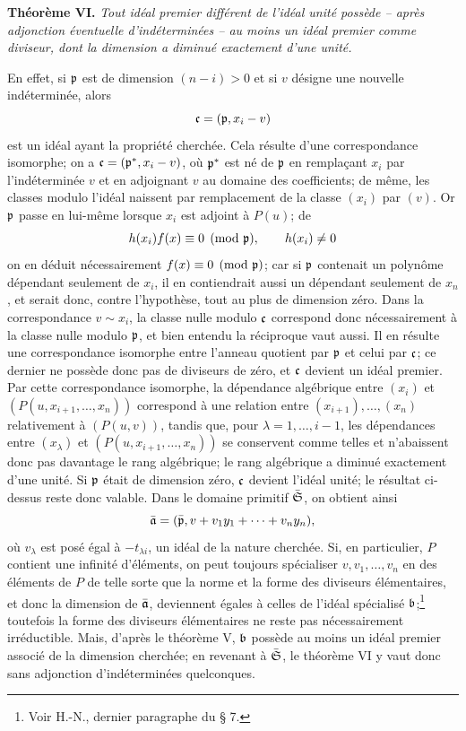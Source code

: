\textbf{Théorème VI.} \emph{Tout idéal premier différent de l'idéal unité possède -- après adjonction éventuelle d'indéterminées -- au moins un idéal premier comme diviseur, dont la dimension a diminué exactement d'une unité.}

En effet, si $\mathfrak p$ est de dimension $(n-i)>0$ et si $v$ désigne une nouvelle indéterminée, alors
\[
 \mathfrak c=(\mathfrak p,x_i-v)
\]
est un idéal ayant la propriété cherchée. Cela résulte d'une correspondance isomorphe; on a $\mathfrak c=(\mathfrak p^*,x_i-v)$, où $\mathfrak p^*$ est né de $\mathfrak p$ en remplaçant $x_i$ par l'indéterminée $v$ et en adjoignant $v$ au domaine des coefficients; de même, les classes modulo l'idéal naissent par remplacement de la classe $(x_i)$ par $(v)$. Or $\mathfrak p$ passe en lui-même lorsque $x_i$ est adjoint à $P(u)$; de
\[
 h(x_i)f(x)\equiv0\pmod{\mathfrak p},\qquad h(x_i)\ne0
\]
on en déduit nécessairement $f(x)\equiv0\pmod{\mathfrak p}$; car si $\mathfrak p$ contenait un polynôme dépendant seulement de $x_i$, il en contiendrait aussi un dépendant seulement de $x_n$, et serait donc, contre l'hypothèse, tout au plus de dimension zéro. Dans la correspondance $v\sim x_i$, la classe nulle modulo $\mathfrak c$ correspond donc nécessairement à la classe nulle modulo $\mathfrak p$, et bien entendu la réciproque vaut aussi. Il en résulte une correspondance isomorphe entre l'anneau quotient par $\mathfrak p$ et celui par $\mathfrak c$; ce dernier ne possède donc pas de diviseurs de zéro, et $\mathfrak c$ devient un idéal premier. Par cette correspondance isomorphe, la dépendance algébrique entre $(x_i)$ et $(P(u,x_{i+1},\ldots,x_n))$ correspond à une relation entre $(x_{i+1}),\ldots,(x_n)$ relativement à $(P(u,v))$, tandis que, pour $\lambda=1,\ldots,i-1$, les dépendances entre $(x_\lambda)$ et $(P(u,x_{i+1},\ldots,x_n))$ se conservent comme telles et n'abaissent donc pas davantage le rang algébrique; le rang algébrique a diminué exactement d'une unité. Si $\mathfrak p$ était de dimension zéro, $\mathfrak c$ devient l'idéal unité; le résultat ci-dessus reste donc valable. Dans le domaine primitif $\bar{\mathfrak S}$, on obtient ainsi
\[
 \bar{\mathfrak a}=(\bar{\mathfrak p},v+v_1y_1+\cdots+v_ny_n),
\]
où $v_\lambda$ est posé égal à $-t_{\lambda i}$, un idéal de la nature cherchée. Si, en particulier, $P$ contient une infinité d'éléments, on peut toujours spécialiser $v,v_1,\ldots,v_n$ en des éléments de $P$ de telle sorte que la norme et la forme des diviseurs élémentaires, et donc la dimension de $\bar{\mathfrak a}$, deviennent égales à celles de l'idéal spécialisé $\mathfrak b$;\footnote{Voir H.-N., dernier paragraphe du \S{} 7.} toutefois la forme des diviseurs élémentaires ne reste pas nécessairement irréductible. Mais, d'après le théorème V, $\mathfrak b$ possède au moins un idéal premier associé de la dimension cherchée; en revenant à $\bar{\mathfrak S}$, le théorème VI y vaut donc sans adjonction d'indéterminées quelconques.

